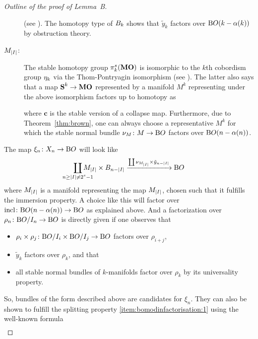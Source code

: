 \begin{proof}[Outline of the proof of Lemma~B]
\begin{description}
    (see \cite[Chap.~II, §2]{immersionconj}).
    The homotopy type of $B_{k}$ shows that $\tilde y_k$
    factors over $\mathrm{B}O(k-\alpha(k))$ by obstruction theory.
  \item[$M_{\left|I\right|}$:]
    The stable homotopy group $\pi_k^s(\bm{\mathrm{MO}})$ is isomorphic
    to the $k$th cobordism group $\eta_k$
    via the Thom-Pontryagin isomorphism (see \cite[Chap.~II]{stong}).
    The latter also says that a map $\bm{\mathrm{S}}^{k}\to\bm{\mathrm{MO}}$
    represented by a manifold $M^k$ representing under the above
    isomorphism factors up to homotopy as
    \begin{center}
    \end{center}
    where $\bm{c}$ is the stable version of a collapse map.
    Furthermore, due to Theorem~\ref{thm:brown}, one can always choose
    a representative $M^k$ for which the stable normal bundle
    $\nu_{M}\colon M\to\mathrm{B}O$ factors over $\mathrm{B}O(n-\alpha(n))$.
  \end{description}
  The map $\xi_n\colon X_n\to\mathrm{B}O$ will look like
  \begin{gather*}
    \coprod_{\mathclap{n\geq\Deg{I}\neq 2^s-1}}
    M_{\Deg{I}} \times \BraidSpace{n-\Deg{I}}
    \xrightarrow{\coprod \N{M_{\Deg{I}}} \times \tilde y_{n-\Deg{I}}}
    \BO
  \end{gather*}
  where $M_{\left|I\right|}$ is a manifold representing the map
  $M_{\left|I\right|}$, chosen such that it fulfills the immersion
  property.
  A choice like this will factor over
  $\mathrm{incl}\colon\mathrm{B}O(n-\alpha(n))\to\mathrm{B}O$ as explained above.
  And a factorization over $\rho_n\colon\mathrm{B}O/I_{n}\to\mathrm{B}O$ is directly
  given if one observes that
  \begin{itemize}
  \item $\rho_i\times\rho_j\colon\mathrm{B}O/I_{i}\times\mathrm{B}O/I_{j}\to\mathrm{B}O$ factors
    over $\rho_{i+j}$,
  \item $\tilde y_k$ factors over $\rho_k$, and that
  \item all stable normal bundles of $k$-manifolds factor over
    $\rho_k$ by its universality property.
  \end{itemize}
  So, bundles of the form described above are candidates
  for $\xi_n$.
  They can also be shown to fulfill the splitting
  property \ref{item:bomodinfactorisation:1} using the well-known
  formula
  \begin{gather*}

\end{gather*}
\end{proof}
